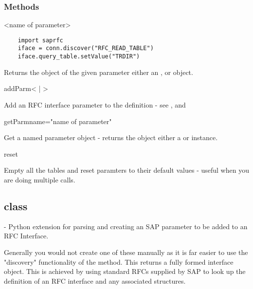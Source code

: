 \documentclass{howto}
\begin{document}
\subsubsection{Methods \label{ifacemeths}}

\begin{methoddesc}[iface]{<name of parameter>}{}

\begin{verbatim}
	import saprfc
	iface = conn.discover("RFC_READ_TABLE")
	iface.query_table.setValue("TRDIR")
\end{verbatim}

Returns the object of the given parameter either an , or  object.

\end{methoddesc}

\begin{methoddesc}[iface]{addParm}{< | >}

Add an RFC interface parameter to the  definition - see , and 

\end{methoddesc}


\begin{methoddesc}[iface]{getParm}{name="name of parameter"}

Get a named parameter object - returns the object either a  or  instance.

\end{methoddesc}


\begin{methoddesc}[iface]{reset}{}

Empty all the tables and reset paramters to their default values - useful when you are doing multiple calls.

\end{methoddesc}



\subsection{class  \label{classparm}}

 - Python extension for parsing and creating an SAP parameter to be added to an RFC Interface.

Generally you would not create one of these manually as it is far easier to use the "discovery" functionality of the  method.  This returns a fully formed interface object.  This is achieved by using standard RFCs supplied by SAP to look up the definition of an RFC interface and any associated structures.
\end{document}
